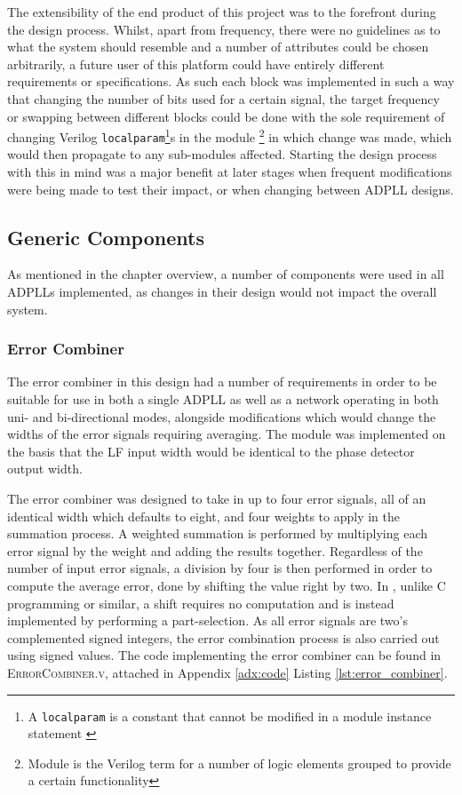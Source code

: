 The extensibility of the end product of this project was to the forefront during the design process. Whilst, apart from frequency, there were no guidelines as to what the system should resemble and a number of attributes could be chosen arbitrarily, a future user of this platform could have entirely different requirements or specifications. As such each block was implemented in such a way that changing the number of bits used for a certain signal, the target frequency or swapping between different blocks could be done with the sole requirement of changing Verilog \texttt{localparam}\footnote{A \texttt{localparam} is a constant that cannot be modified in a module instance statement \cite{hdlworks}}s in the module \footnote{Module is the Verilog term for a number of logic elements grouped to provide a certain functionality} in which change was made, which would then propagate to any sub-modules affected. Starting the design process with this in mind was a major benefit at later stages when frequent modifications were being made to test their impact, or when changing between \ac{ADPLL} designs.

\subsection{Generic Components}
As mentioned in the chapter overview, a number of components were used in all \acp{ADPLL} implemented, as changes in their design would not impact the overall system.
\subsubsection{Error Combiner}
The error combiner in this design had a number of requirements in order to be suitable for use in both a single \ac{ADPLL} as well as a network operating in both uni- and bi-directional modes, alongside modifications which would change the widths of the error signals requiring averaging. The module was implemented on the basis that the \ac{LF} input width would be identical to the phase detector output width.

The error combiner was designed to take in up to four error signals, all of an identical width which defaults to eight, and four weights to apply in the summation process. A weighted summation is performed by multiplying each error signal by the weight and adding the results together. Regardless of the number of input error signals, a division by four is then performed in order to compute the average error, done by shifting the value right by two. In , unlike C programming or similar, a shift requires no computation and is instead implemented by performing a part-selection. As all error signals are two's complemented signed integers, the error combination process is also carried out using signed values. The code implementing the error combiner can be found in \textsc{ErrorCombiner.v}, attached in Appendix \ref{adx:code} Listing \ref{lst:error_combiner}.

